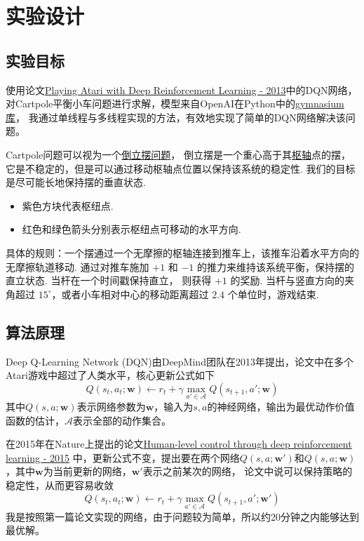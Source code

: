\documentclass[12pt, a4paper, oneside]{ctexart}
\numberwithin{equation}{section}  %
\def\bd{\boldsymbol}        %
\begin{document}
\section{实验设计}
\subsection{实验目标}
使用论文\href{https://arxiv.org/abs/1312.5602}{Playing Atari with Deep Reinforcement Learning - 2013}中的DQN网络，
对Cartpole平衡小车问题进行求解，模型来自OpenAI在Python中的\href{https://gymnasium.farama.org/environments/classic\_control/cart\_pole/}{gymnasium库}，
我通过单线程与多线程实现的方法，有效地实现了简单的DQN网络解决该问题。

Cartpole问题可以视为一个\href{https://baike.baidu.com/item/%E5%80%92%E7%AB%8B%E6%91%86/7765096}{倒立摆问题}，
倒立摆是一个重心高于其\href{https://baike.baidu.com/item/%E6%9E%A2%E8%BD%B4/2010044}{枢轴}点的摆，
它是不稳定的，但是可以通过移动枢轴点位置以保持该系统的稳定性. 我们的目标是尽可能长地保持摆的垂直状态.

\begin{itemize}
    \item 紫色方块代表枢纽点.
    \item 红色和绿色箭头分别表示枢纽点可移动的水平方向.
\end{itemize}

具体的规则：一个摆通过一个无摩擦的枢轴连接到推车上，该推车沿着水平方向的无摩擦轨道移动. 
通过对推车施加 $+1$ 和 $-1$ 的推力来维持该系统平衡，保持摆的直立状态. 当杆在一个时间戳保持直立，
则获得 $+1$ 的奖励. 当杆与竖直方向的夹角超过 $15^\circ$，或者小车相对中心的移动距离超过 $2.4$ 个单位时，游戏结束.

\subsection{算法原理}
Deep Q-Learning Network (DQN)由DeepMind团队在2013年提出，论文中在多个Atari游戏中超过了人类水平，核心更新公式如下
\begin{equation*}
    Q(s_t,a_t;\bd{w}) \gets r_t + \gamma \max_{a'\in\mathcal{A}}Q(s_{t+1},a';\bd{w})
\end{equation*}
其中$Q(s,a;\bd{w})$表示网络参数为$\bd{w}$，输入为$s,a$的神经网络，输出为最优动作价值函数的估计，$\mathcal{A}$表示全部的动作集合。

在2015年在Nature上提出的论文\href{https://www.nature.com/articles/nature14236}{Human-level control through deep reinforcement learning - 2015}
中，更新公式不变，提出要在两个网络$Q(s,a;\bd{w}')$和$Q(s,a;\bd{w})$，其中$\bd{w}$为当前更新的网络，$\bd{w}'$表示之前某次的网络，
论文中说可以保持策略的稳定性，从而更容易收敛
\begin{equation*}
    Q(s_t,a_t;\bd{w}) \gets r_t + \gamma \max_{a'\in\mathcal{A}}Q(s_{t+1},a';\bd{w}')
\end{equation*}
我是按照第一篇论文实现的网络，由于问题较为简单，所以约20分钟之内能够达到最优解。
\end{document}
